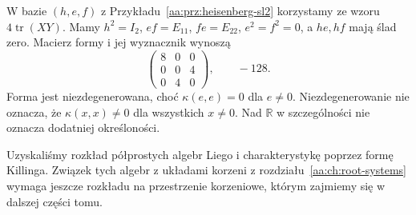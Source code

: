 \begin{przyklad}
\label{aa:prz:killing-sl2}
W bazie $(h,e,f)$ z Przykładu~\ref{aa:prz:heisenberg-sl2}
korzystamy ze wzoru $4\operatorname{tr}(XY)$.
Mamy $h^2=I_2$, $ef=E_{11}$, $fe=E_{22}$,
$e^2=f^2=0$, a $he,hf$ mają ślad zero.
Macierz formy i jej wyznacznik wynoszą
\[
 \begin{pmatrix}8&0&0\\0&0&4\\0&4&0\end{pmatrix},
 \qquad -128.
\]
Forma jest niezdegenerowana, choć $\kappa(e,e)=0$
dla $e\ne0$. Niezdegenerowanie nie oznacza, że
$\kappa(x,x)\ne0$ dla wszystkich $x\ne0$.
Nad $\mathbb R$ w szczególności nie oznacza
dodatniej określoności.
\end{przyklad}

Uzyskaliśmy rozkład półprostych algebr Liego i
charakterystykę poprzez formę Killinga. Związek
tych algebr z układami korzeni z rozdziału~\ref{aa:ch:root-systems}
wymaga jeszcze rozkładu na przestrzenie korzeniowe,
którym zajmiemy się w dalszej części tomu.
